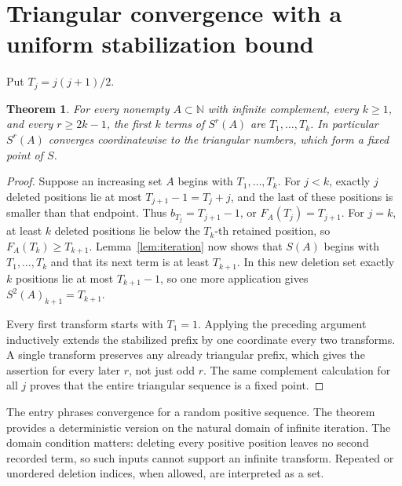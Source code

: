\documentclass[10pt]{article}
\newtheorem{theorem}{Theorem}
\begin{document}
\section{Triangular convergence with a uniform stabilization bound}
Put $T_j=j(j+1)/2$.
\begin{theorem}\label{thm:triangular}
For every nonempty $A\subset\mathbb N$ with infinite complement, every $k\ge1$,
and every $r\ge2k-1$, the first $k$ terms of $S^r(A)$ are
$T_1,\ldots,T_k$. In particular $S^r(A)$ converges coordinatewise to the
triangular numbers, which form a fixed point of $S$.
\end{theorem}
\begin{proof}
Suppose an increasing set $A$ begins with $T_1,\ldots,T_k$. For $j<k$,
exactly $j$ deleted positions lie at most $T_{j+1}-1=T_j+j$, and the last
of these positions is smaller than that endpoint. Thus
$b_{T_j}=T_{j+1}-1$, or $F_A(T_j)=T_{j+1}$.
For $j=k$, at least $k$ deleted positions lie below the $T_k$-th retained
position, so $F_A(T_k)\ge T_{k+1}$.
Lemma~\ref{lem:iteration} now shows that $S(A)$ begins with
$T_1,\ldots,T_k$ and that its next term is at least $T_{k+1}$.
In this new deletion set exactly $k$ positions lie at most $T_{k+1}-1$,
so one more application gives $S^2(A)_{k+1}=T_{k+1}$.

Every first transform starts with $T_1=1$. Applying the preceding argument
inductively extends the stabilized prefix by one coordinate every two
transforms. A single transform preserves any already triangular prefix,
which gives the assertion for every later $r$, not just odd $r$.
The same complement calculation for all $j$ proves that the entire triangular
sequence is a fixed point.
\end{proof}
The entry phrases convergence for a random positive sequence. The theorem
provides a deterministic version on the natural domain of infinite iteration.
The domain condition matters: deleting every positive position leaves no
second recorded term, so such inputs cannot support an infinite transform.
Repeated or unordered deletion indices, when allowed, are interpreted as a set.
\end{document}
